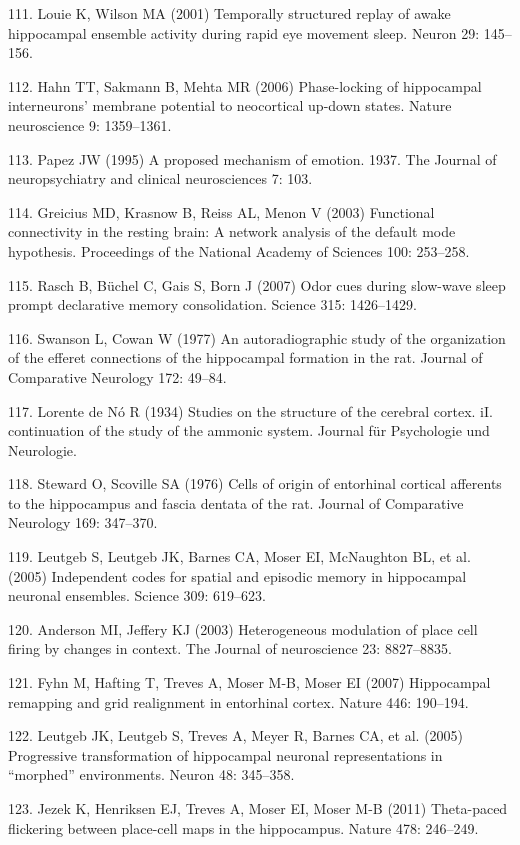 \documentclass[]{article}
\begin{document}
111. Louie K, Wilson MA (2001) Temporally structured replay of awake
hippocampal ensemble activity during rapid eye movement sleep. Neuron
29: 145--156.

112. Hahn TT, Sakmann B, Mehta MR (2006) Phase-locking of hippocampal
interneurons' membrane potential to neocortical up-down states. Nature
neuroscience 9: 1359--1361.

113. Papez JW (1995) A proposed mechanism of emotion. 1937. The Journal
of neuropsychiatry and clinical neurosciences 7: 103.

114. Greicius MD, Krasnow B, Reiss AL, Menon V (2003) Functional
connectivity in the resting brain: A network analysis of the default
mode hypothesis. Proceedings of the National Academy of Sciences 100:
253--258.

115. Rasch B, B{ü}chel C, Gais S, Born J (2007) Odor cues during
slow-wave sleep prompt declarative memory consolidation. Science 315:
1426--1429.

116. Swanson L, Cowan W (1977) An autoradiographic study of the
organization of the efferet connections of the hippocampal formation in
the rat. Journal of Comparative Neurology 172: 49--84.

117. Lorente de N{ó} R (1934) Studies on the structure of the cerebral
cortex. iI. continuation of the study of the ammonic system. Journal für
Psychologie und Neurologie.

118. Steward O, Scoville SA (1976) Cells of origin of entorhinal
cortical afferents to the hippocampus and fascia dentata of the rat.
Journal of Comparative Neurology 169: 347--370.

119. Leutgeb S, Leutgeb JK, Barnes CA, Moser EI, McNaughton BL, et al.
(2005) Independent codes for spatial and episodic memory in hippocampal
neuronal ensembles. Science 309: 619--623.

120. Anderson MI, Jeffery KJ (2003) Heterogeneous modulation of place
cell firing by changes in context. The Journal of neuroscience 23:
8827--8835.

121. Fyhn M, Hafting T, Treves A, Moser M-B, Moser EI (2007) Hippocampal
remapping and grid realignment in entorhinal cortex. Nature 446:
190--194.

122. Leutgeb JK, Leutgeb S, Treves A, Meyer R, Barnes CA, et al. (2005)
Progressive transformation of hippocampal neuronal representations in
``morphed'' environments. Neuron 48: 345--358.

123. Jezek K, Henriksen EJ, Treves A, Moser EI, Moser M-B (2011)
Theta-paced flickering between place-cell maps in the hippocampus.
Nature 478: 246--249.
\end{document}
